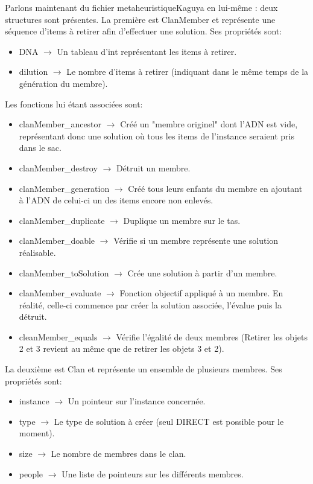 \documentclass{EPUProjetPeiP}
\begin{document}
Parlons maintenant du fichier metaheuristiqueKaguya en lui-même : deux structures sont présentes. La première est ClanMember et représente une séquence d'items à retirer afin d'effectuer une solution. Ses propriétés sont:
\begin{itemize}
	\item DNA $\longrightarrow$ Un tableau d'int représentant les items à retirer.
	\item dilution $\longrightarrow$ Le nombre d'items à retirer (indiquant dans le même temps de la génération du membre).\\
\end{itemize}

Les fonctions lui étant associées sont:
\begin{itemize}
	\item clanMember\_ancestor $\longrightarrow$ Créé un "membre originel" dont l'ADN est vide, représentant donc une solution où tous les items de l'instance seraient pris dans le sac. 
	\item clanMember\_destroy $\longrightarrow$ Détruit un membre.
	\item clanMember\_generation $\longrightarrow$ Créé tous leurs enfants du membre en ajoutant à l'ADN de celui-ci un des items encore non enlevés.
	\item clanMember\_duplicate $\longrightarrow$ Duplique un membre sur le tas.
	\item clanMember\_doable $\longrightarrow$ Vérifie si un membre représente une solution réalisable.
	\item clanMember\_toSolution $\longrightarrow$ Crée une solution à partir d'un membre.
	\item clanMember\_evaluate $\longrightarrow$ Fonction objectif appliqué à un membre. En réalité, celle-ci commence par créer la solution associée, l'évalue puis la détruit.
	\item cleanMember\_equals $\longrightarrow$ Vérifie l'égalité de deux membres (Retirer les objets 2 et 3 revient au même que de retirer les objets 3 et 2).\\
\end{itemize}


La deuxième est Clan et représente un ensemble de plusieurs membres. Ses propriétés sont:
\begin{itemize}
	\item instance $\longrightarrow$ Un pointeur sur l'instance concernée.
	\item type $\longrightarrow$ Le type de solution à créer (seul DIRECT est possible pour le moment).
	\item size $\longrightarrow$ Le nombre de membres dans le clan.
	\item people $\longrightarrow$ Une liste de pointeurs sur les différents membres.\\
\end{itemize}
\end{document}
